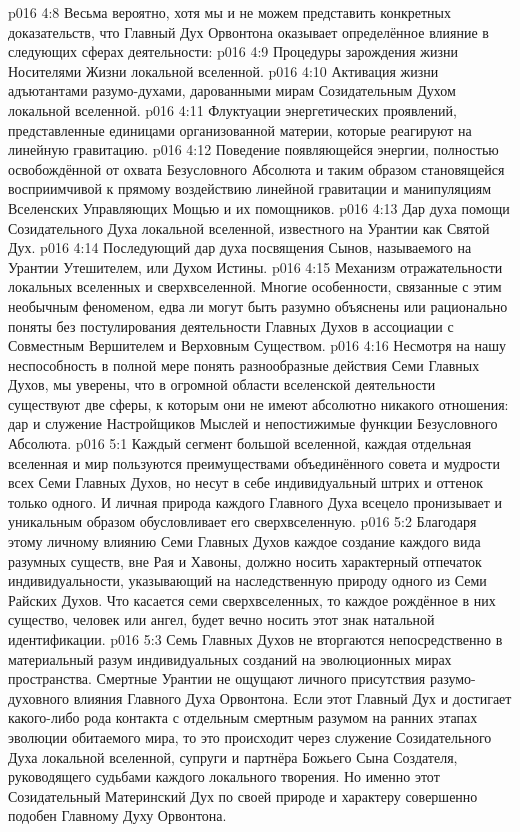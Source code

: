 \vs p016 4:8 \pc Весьма вероятно, хотя мы и не можем представить конкретных доказательств, что Главный Дух Орвонтона оказывает определённое влияние в следующих сферах деятельности:
\vs p016 4:9 Процедуры зарождения жизни Носителями Жизни локальной вселенной.
\vs p016 4:10 Активация жизни адъютантами разумо\hyp{}духами, дарованными мирам Созидательным Духом локальной вселенной.
\vs p016 4:11 Флуктуации энергетических проявлений, представленные единицами организованной материи, которые реагируют на линейную гравитацию.
\vs p016 4:12 Поведение появляющейся энергии, полностью освобождённой от охвата Безусловного Абсолюта и таким образом становящейся восприимчивой к прямому воздействию линейной гравитации и манипуляциям Вселенских Управляющих Мощью и их помощников.
\vs p016 4:13 Дар духа помощи Созидательного Духа локальной вселенной, известного на Урантии как Святой Дух.
\vs p016 4:14 Последующий дар духа посвящения Сынов, называемого на Урантии Утешителем, или Духом Истины.
\vs p016 4:15 Механизм отражательности локальных вселенных и сверхвселенной. Многие особенности, связанные с этим необычным феноменом, едва ли могут быть разумно объяснены или рационально поняты без постулирования деятельности Главных Духов в ассоциации с Совместным Вершителем и Верховным Существом.
\vs p016 4:16 \pc Несмотря на нашу неспособность в полной мере понять разнообразные действия Семи Главных Духов, мы уверены, что в огромной области вселенской деятельности существуют две сферы, к которым они не имеют абсолютно никакого отношения: дар и служение Настройщиков Мыслей и непостижимые функции Безусловного Абсолюта.
\vs p016 5:1 Каждый сегмент большой вселенной, каждая отдельная вселенная и мир пользуются преимуществами объединённого совета и мудрости всех Семи Главных Духов, но несут в себе индивидуальный штрих и оттенок только одного. И личная природа каждого Главного Духа всецело пронизывает и уникальным образом обусловливает его сверхвселенную.
\vs p016 5:2 Благодаря этому личному влиянию Семи Главных Духов каждое создание каждого вида разумных существ, вне Рая и Хавоны, должно носить характерный отпечаток индивидуальности, указывающий на наследственную природу одного из Семи Райских Духов. Что касается семи сверхвселенных, то каждое рождённое в них существо, человек или ангел, будет вечно носить этот знак натальной идентификации.
\vs p016 5:3 Семь Главных Духов не вторгаются непосредственно в материальный разум индивидуальных созданий на эволюционных мирах пространства. Смертные Урантии не ощущают личного присутствия разумо\hyp{}духовного влияния Главного Духа Орвонтона. Если этот Главный Дух и достигает какого\hyp{}либо рода контакта с отдельным смертным разумом на ранних этапах эволюции обитаемого мира, то это происходит через служение Созидательного Духа локальной вселенной, супруги и партнёра Божьего Сына Создателя, руководящего судьбами каждого локального творения. Но именно этот Созидательный Материнский Дух по своей природе и характеру совершенно подобен Главному Духу Орвонтона.
